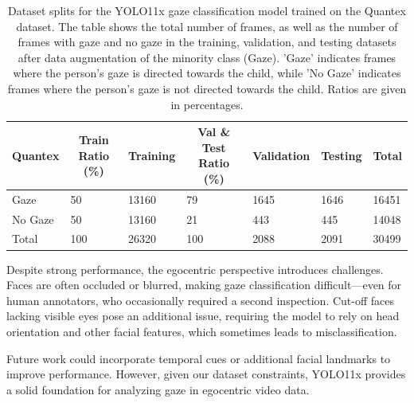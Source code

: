 \documentclass[
  man,floatsintext]{apa6}
\begin{document}
\begin{table}[tbp]

\begin{center}
\begin{threeparttable}

\caption{\label{tab:gaze-dataset-splits-short}Dataset splits for the YOLO11x gaze classification model trained on the Quantex dataset. The table shows the total number of frames, as well as the number of frames with gaze and no gaze in the training, validation, and testing datasets after data augmentation of the minority class (Gaze). 'Gaze' indicates frames where the person's gaze is directed towards the child, while 'No Gaze' indicates frames where the person's gaze is not directed towards the child. Ratios are given in percentages.}

\begin{tabular}{lllllll}
\toprule
Quantex & \multicolumn{1}{c}{Train Ratio (\%)} & \multicolumn{1}{c}{Training} & \multicolumn{1}{c}{Val \& Test Ratio (\%)} & \multicolumn{1}{c}{Validation} & \multicolumn{1}{c}{Testing} & \multicolumn{1}{c}{Total}\\
\midrule
Gaze & 50 & 13160 & 79 & 1645 & 1646 & 16451\\
No Gaze & 50 & 13160 & 21 & 443 & 445 & 14048\\
Total & 100 & 26320 & 100 & 2088 & 2091 & 30499\\
\bottomrule
\end{tabular}

\end{threeparttable}
\end{center}

\end{table}

Despite strong performance, the egocentric perspective introduces challenges. Faces are often occluded or blurred, making gaze classification difficult---even for human annotators, who occasionally required a second inspection. Cut-off faces lacking visible eyes pose an additional issue, requiring the model to rely on head orientation and other facial features, which sometimes leads to misclassification.

Future work could incorporate temporal cues or additional facial landmarks to improve performance. However, given our dataset constraints, YOLO11x provides a solid foundation for analyzing gaze in egocentric video data.
\end{document}
